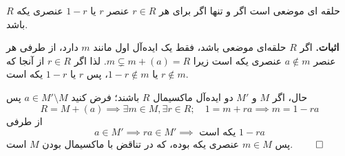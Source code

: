 \begin{frame}
    \begin{theorem}
        \(R\)
        حلقه ای موضعی است اگر و تنها اگر برای هر
        \(r\in R\)
        عنصر
        \(r\)
        یا
        \(1-r\)
        عنصری یکه باشد.
    \end{theorem}

    \textbf{اثبات.}
    اگر
    \(R\)
    حلقه‌ای
    موضعی باشد،‌ فقط یک ایده‌آل اول مانند
    \(m\)
    دارد، از طرفی هر عنصر
    \(a \notin m\)
    عنصری یکه است زیرا
    \(m \subsetneq m + (a) = R\).
    لذا اگر
    \(r \in R\)
    از آنجا که
    \(r \notin m\)
    یا
    \(1-r \notin m\)، پس
    \(r \)
    یا
    \(1-r \)
    یکه است.

    حال، اگر
    \(M\)
    و
    \(M'\)
    دو ایده‌آل ماکسیمال
    \(R\)
    باشند؛ فرض کنید
    \(a \in M' \setminus M\)
    پس
    \[
        R = M + (a) \implies \exists m \in M, \exists r \in R; \quad 1 = m + ra \implies m = 1 - ra
    \]
    از طرفی
    \[
        a \in M' \implies ra \in M' \implies \text{ یکه است } 1 - ra
    \]
    پس
    \(m \in M\)
    عنصری یکه بوده، که در تناقض با ماکسیمال بودن
    \(M\)
    است.
\hfill \(\qed\)
\end{frame}

